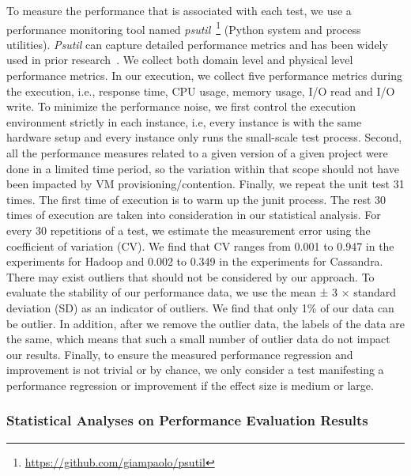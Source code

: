 To measure the performance that is associated with each test, we %
use a performance monitoring tool named \emph{psutil}~\footnote{\url{https://github.com/giampaolo/psutil}} (Python system and process utilities). %
\emph{Psutil} can capture detailed performance metrics and has been widely used in prior research~\cite{DBLP:conf/icsm/ChenS17,DBLP:conf/wosp/YaoPSSTS18}. We collect both domain level and physical level performance metrics. In our execution, we collect five performance metrics during the execution, i.e., response time, CPU usage, memory usage, I/O read and I/O write. 
To minimize the performance noise, we first control the execution environment strictly in each instance, i.e, every instance is with the same hardware setup and every instance only runs the small-scale test process. Second, all the performance measures related to a given version of a given project were done in a limited time period, so the variation within that scope should not have been impacted by VM provisioning/contention. Finally, we repeat the unit test 31 times. The first time of execution is to warm up the junit process. The rest 30 times of execution are taken into consideration in our statistical analysis. 
For every 30 repetitions of a test, we estimate the measurement error using the coefficient of variation (CV). We find that CV ranges from 0.001 to 0.947 in the experiments for Hadoop and 0.002 to 0.349 in the experiments for Cassandra. There may exist outliers that should not be considered by our approach. To evaluate the stability of our performance data, we use the mean ± 3 × standard deviation (SD) as an indicator of outliers. We find that only 1\% of our data can be outlier. In addition, after we remove the outlier data, the labels of the data are the same, which means that such a small number of outlier data do not impact our results.
Finally, to ensure the measured performance regression and improvement is not trivial or by chance, we only consider a test manifesting a performance regression or improvement if the effect size is medium or large.


\subsubsection{Statistical Analyses on Performance Evaluation Results}
\label{sec:statisticalAnalysis}

